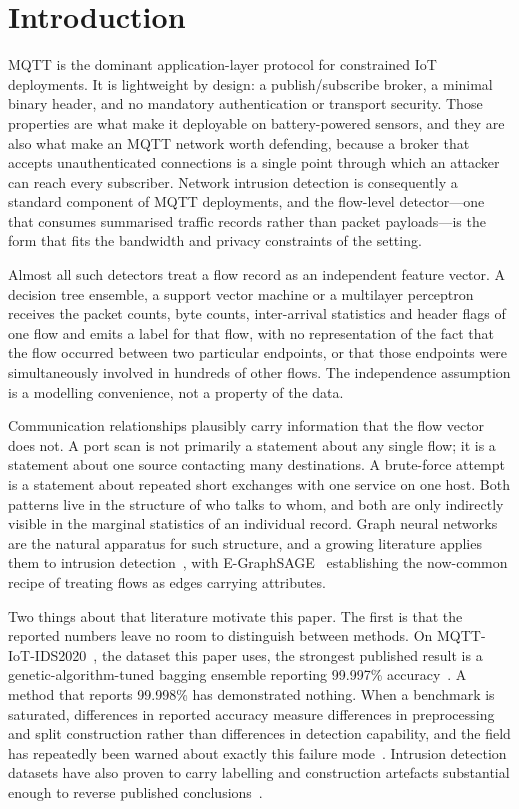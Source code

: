 \section{Introduction}
\label{sec:intro}

MQTT is the dominant application-layer protocol for constrained IoT
deployments. It is lightweight by design: a publish/subscribe broker, a
minimal binary header, and no mandatory authentication or transport security.
Those properties are what make it deployable on battery-powered sensors, and
they are also what make an MQTT network worth defending, because a broker that
accepts unauthenticated connections is a single point through which an attacker
can reach every subscriber. Network intrusion detection is consequently a
standard component of MQTT deployments, and the flow-level detector---one that
consumes summarised traffic records rather than packet payloads---is the form
that fits the bandwidth and privacy constraints of the setting.

Almost all such detectors treat a flow record as an independent feature
vector. A decision tree ensemble, a support vector machine or a multilayer
perceptron receives the packet counts, byte counts, inter-arrival statistics
and header flags of one flow and emits a label for that flow, with no
representation of the fact that the flow occurred between two particular
endpoints, or that those endpoints were simultaneously involved in hundreds of
other flows. The independence assumption is a modelling convenience, not a
property of the data.

Communication relationships plausibly carry information that the flow vector
does not. A port scan is not primarily a statement about any single flow; it is
a statement about one source contacting many destinations. A brute-force
attempt is a statement about repeated short exchanges with one service on one
host. Both patterns live in the structure of who talks to whom, and both are
only indirectly visible in the marginal statistics of an individual record.
Graph neural networks are the natural apparatus for such structure, and a
growing literature applies them to intrusion detection~\cite{bilot2024survey,
gnnids2026survey}, with E-GraphSAGE~\cite{lo2022egraphsage} establishing the
now-common recipe of treating flows as edges carrying attributes.

Two things about that literature motivate this paper. The first is that the
reported numbers leave no room to distinguish between methods. On
MQTT-IoT-IDS2020~\cite{hindy2020mqttdataset}, the dataset this paper uses, the
strongest published result is a genetic-algorithm-tuned bagging ensemble
reporting 99.997\% accuracy~\cite{norouzi2026reliable}. A method that reports
99.998\% has demonstrated nothing. When a benchmark is saturated, differences
in reported accuracy measure differences in preprocessing and split
construction rather than differences in detection capability, and the field has
repeatedly been warned about exactly this failure
mode~\cite{arp2024pitfalls,sommer2010outside}. Intrusion detection datasets
have also proven to carry labelling and construction artefacts substantial
enough to reverse published
conclusions~\cite{engelen2021troubleshooting,lanvin2022errors}.

